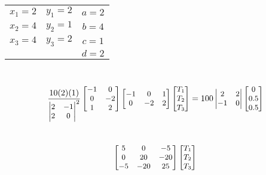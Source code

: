 \documentclass[10pt]{article}
\begin{document}
\begin{enumerate}
\begin{minipage}{0.5\textwidth}
\end{minipage}
\begin{minipage}{0.5\textwidth}
\begin{tabular}{ccc}
$x_1 = 2$ & $y_1 = 2$ & $a = 2 $\\
$x_2 = 4 $& $y_2 = 1$ & $b = 4 $\\
$x_3 = 4$ & $y_3 = 2$ & $c = 1 $ \\
 & & $d = 2$
\end{tabular}
\end{minipage} \\
\begin{align*}
\small{
\frac{10(2)(1)}
{\begin{vmatrix}
2 & -1 \\
2 & 0
\end{vmatrix}^2} 
\begin{bmatrix}
-1 & 0\\
 0 & -2 \\
 1 & 2
\end{bmatrix} 
\begin{bmatrix}
-1 & 0 & 1 \\
0 & -2 & 2
\end{bmatrix} 
\begin{bmatrix}
T_1 \\ T_2 \\ T_3
\end{bmatrix} = 100 
\begin{vmatrix} 2 & 2 \\ 
-1 & 0 \end{vmatrix} 
\begin{bmatrix} 
0 \\ 0.5 \\ 0.5
\end{bmatrix}}
\end{align*}\\
\begin{align*}
\small{
\begin{bmatrix}
5 & 0 & -5\\
0 & 20 & -20 \\
-5 & -20 & 25
\end{bmatrix}
\begin{bmatrix} 
T_1 \\ T_2 \\ T_3

\end{bmatrix}}
\end{align*}
\end{enumerate}
\end{document}
